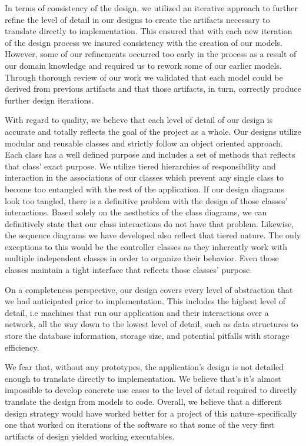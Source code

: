 \documentclass[a4paper]{report}
\begin{document}
	In terms of consistency of the design, we utilized an iterative approach to further refine the level of detail in our designs to create the artifacts necessary to translate directly to implementation. This ensured that with each new iteration of the design process we insured consistency with the creation of our models. However, some of our refinements occurred too early in the process as a result of our domain knowledge and required us to rework some of our earlier models. Through thorough review of our work we validated that each model could be derived from previous artifacts and that those artifacts, in turn, correctly produce further design iterations.

	With regard to quality, we believe that each level of detail of our design is accurate and totally reflects the goal of the project as a whole. Our designs utilize modular and reusable classes and strictly follow an object oriented approach. Each class has a well defined purpose and includes a set of methods that reflects that class’ exact purpose. We utilize tiered hierarchies of responsibility and interaction in the associations of our classes which prevent any single class to become too entangled with the rest of the application. If our design diagrams look too tangled, there is a definitive problem with the design of those classes’ interactions. Based solely on the aesthetics of the class diagrams, we can definitively state that our class interactions do not have that problem. Likewise, the sequence diagrams we have developed also reflect that tiered nature. The only exceptions to this would be the controller classes as they inherently work with multiple independent classes in order to organize their behavior. Even those classes maintain a tight interface that reflects those classes’ purpose.

	On a completeness perspective, our design covers every level of abstraction that we had anticipated prior to implementation. This includes the highest level of detail, i.e machines that run our application and their interactions over a network, all the way down to the lowest level of detail, such as data structures to store the database information, storage size, and potential pitfalls with storage efficiency.

	We fear that, without any prototypes, the application's design is not detailed enough to translate directly to implementation. We believe that's it's almost impossible to develop concrete use cases to the level of detail required to directly translate the design from models to code. Overall, we believe that a different design strategy would have worked better for a project of this nature--specifically one that worked on iterations of the software so that some of the very first artifacts of design yielded working executables.
\end{document}
